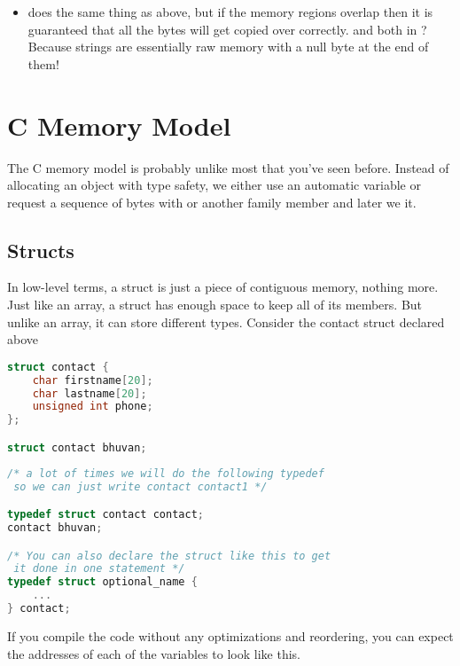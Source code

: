 \begin{itemize}
	    \item {} does the same thing as above, but if the memory regions overlap then it is guaranteed that all the bytes will get copied over correctly.
         and  both in ? Because strings are essentially raw memory with a null byte at the end of them!

\end{itemize}

\section{C Memory Model}

The C memory model is probably unlike most that you've seen before. Instead of allocating an object with type safety, we either use an automatic variable or request a sequence of bytes with  or another family member and later we  it.

\subsection{Structs}

In low-level terms, a struct is just a piece of contiguous memory, nothing more.
Just like an array, a struct has enough space to keep all of its members.
But unlike an array, it can store different types. Consider the contact struct declared above

\begin{lstlisting}[language=C]
struct contact {
    char firstname[20];
    char lastname[20];
    unsigned int phone;
};

struct contact bhuvan;
\end{lstlisting}

\begin{lstlisting}[language=C]
/* a lot of times we will do the following typedef
 so we can just write contact contact1 */

typedef struct contact contact;
contact bhuvan;

/* You can also declare the struct like this to get
 it done in one statement */
typedef struct optional_name {
    ...
} contact;
\end{lstlisting}

If you compile the code without any optimizations and reordering, you can expect the addresses of each of the variables to look like this.

